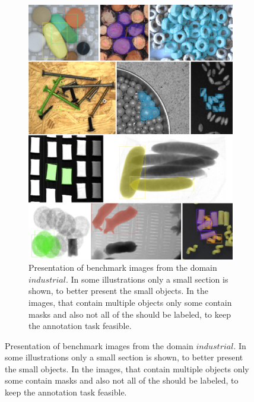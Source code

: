 \begin{figure} \ContinuedFloat
	\begin{subfigure}[t]{1.0\textwidth} 
		\centering
		\includegraphics[width=\textwidth]{figures/appendix/benchmark_dataset_examples/industrial_collage.png}
		\caption{
			Presentation of benchmark images from the domain $ industrial $.
			In some illustrations only a small section is shown, to better present the small objects.
			In the images, that contain multiple objects only some contain masks and also not all of the should be labeled, to keep the annotation task feasible.
		} \label{fig:appendix_domain_industrial}
	\end{subfigure}
\end{figure}
	

